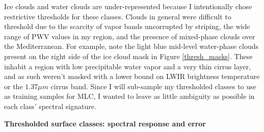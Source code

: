 \documentclass[12pt]{article}
\begin{document}
Ice clouds and water clouds are under-represented because I intentionally chose restrictive thresholds for these classes. Clouds in general were difficult to threshold due to the scarcity of vapor bands uncorrupted by striping, the wide range of PWV values in my region, and the presence of mixed-phase clouds over the Mediterranean. For example, note the light blue mid-level water-phase clouds present on the right side of the ice cloud mask in Figure \ref{thresh_masks}. These inhabit a region with low precipitable water vapor and a very thin cirrus layer, and as such weren't masked with a lower bound on LWIR brightness temperature or the $1.37\mu m$ cirrus band. Since I will sub-sample my thresholded classes to use as training samples for MLC, I wanted to leave as little ambiguity as possible in each class' spectral signature.

\clearpage

\noindent
\textbf{Thresholded surface classes: spectral response and error}
\end{document}
